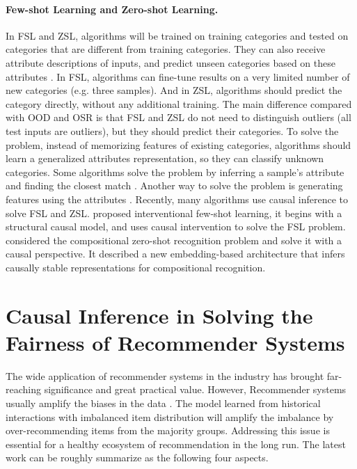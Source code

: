 \documentclass{article}
\begin{document}
\paragraph{Few-shot Learning and Zero-shot Learning.}
In FSL and ZSL, algorithms will be trained on training categories and tested on categories that are different
from training categories. They can also receive attribute descriptions of inputs, and predict
unseen categories based on these attributes \cite{lampert2009learning,xian2018zero}. In FSL, algorithms can fine-tune
results on a very limited number of new categories (e.g. three samples). And in ZSL, algorithms
should predict the category directly, without any additional training. The main difference compared
with OOD and OSR is that FSL and ZSL do not need to distinguish outliers (all test inputs are outliers),
but they should predict their categories. To solve the problem, instead of memorizing features
of existing categories, algorithms should learn a generalized attributes representation, so
they can classify unknown categories.
%
Some algorithms solve the problem by inferring a sample's attribute and finding the closest match
\cite{akata2015label,chen2018zero,jiang2019transferable}. Another way to solve the problem is
generating features using the attributes \cite{li2019leveraging,narayan2020latent,pambala2020generative}.
%
Recently, many algorithms use causal inference to solve FSL and ZSL. \cite{yue2020interventional} proposed
interventional few-shot learning, it begins with a structural causal model, and uses causal intervention to
solve the FSL problem. \cite{atzmon2020causal} considered the compositional zero-shot recognition problem and
solve it with a causal perspective. It described a new embedding-based architecture that infers causally
stable representations for compositional recognition.





\section{Causal Inference in Solving the Fairness of Recommender Systems}

The wide application of recommender systems in the industry has brought far-reaching significance and great practical value. However, Recommender systems usually amplify the biases in the data \cite{wang2021deconfounded}. The model learned from historical interactions with imbalanced item distribution will amplify the imbalance by over-recommending items from the majority groups. Addressing this issue is essential for a healthy ecosystem of recommendation in the long run. The latest work can be roughly summarize as the following four aspects.
\end{document}
